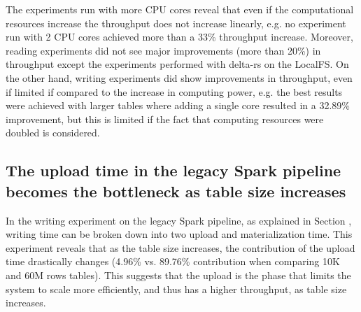 The experiments run with more \gls{CPU} cores reveal that even if the computational resources increase the throughput does not increase linearly, e.g. no experiment run with 2 \gls{CPU} cores achieved more than a 33\% throughput increase. Moreover, reading experiments did not see major improvements (more than 20\%) in throughput except the experiments performed with delta-rs on the \gls{LocalFS}. On the other hand, writing experiments did show improvements in throughput, even if limited if compared to the increase in computing power, e.g. the best results were achieved with larger tables where adding a single core resulted in a 32.89\% improvement, but this is limited if the fact that computing resources were doubled is considered.

\subsection{The upload time in the legacy Spark pipeline becomes the bottleneck as table size increases}

In the writing experiment on the legacy Spark pipeline, as explained in Section , writing time can be broken down into two upload and materialization time. This experiment reveals that as the table size increases, the contribution of the upload time drastically changes (4.96\% vs. 89.76\% contribution when comparing 10K and 60M rows tables). This suggests that the upload is the phase that limits the system to scale more efficiently, and thus has a higher throughput, as table size increases.